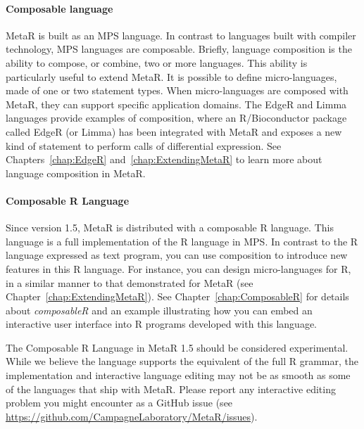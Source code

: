 \paragraph{Composable language}
MetaR is built as an MPS language. In contrast to languages built with compiler technology, MPS languages are composable. Briefly, language composition is the ability to compose, or combine, two or more languages. This ability is particularly useful to extend MetaR. It is possible to define micro-languages, made of one or two statement types. When micro-languages are composed with  MetaR, they can support specific application domains. The EdgeR and Limma languages provide  examples of composition, where an R/Bioconductor package called EdgeR (or Limma) has been integrated with MetaR and exposes a new kind of statement to perform calls of differential expression. See Chapters~\ref{chap:EdgeR} and~\ref{chap:ExtendingMetaR} to learn more about language composition  in MetaR.

\paragraph{Composable R Language}

Since version 1.5, MetaR is distributed with a composable R language. This language is a full implementation of the R language in MPS. In contrast to the R language expressed as text program, you can use composition to introduce new features in this R language. For instance, you can design micro-languages for R, in a similar manner to that demonstrated for MetaR (see Chapter~\ref{chap:ExtendingMetaR}). See Chapter~\ref{chap:ComposableR} for details about \textit{composableR}  and an example illustrating how you can embed an interactive user interface into R programs developed with this language.
\begin{remark}
 The Composable R Language in MetaR 1.5 should be considered experimental. While we believe the language supports the equivalent of the full R grammar, the implementation and interactive language editing may not be as smooth as some of the languages that ship with MetaR. Please report any interactive editing problem you might encounter as a GitHub issue (see \url{https://github.com/CampagneLaboratory/MetaR/issues}).
\end{remark}

  
